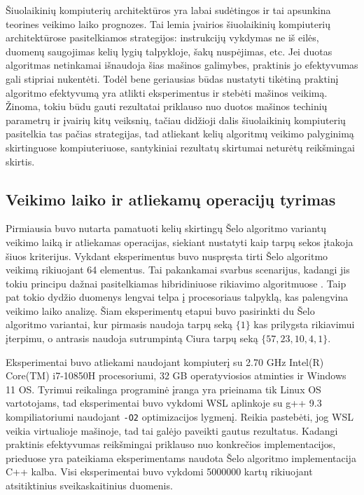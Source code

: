 \documentclass{VUMIFInfBakalaurinis}
\begin{document}
Šiuolaikinių kompiuterių architektūros yra labai sudėtingos ir tai apsunkina teorines veikimo laiko prognozes.
Tai lemia įvairios šiuolaikinių kompiuterių architektūrose pasitelkiamos strategijos:
instrukcijų vykdymas ne iš eilės, duomenų saugojimas kelių lygių talpykloje, šakų nuspėjimas, etc.
Jei duotas algoritmas netinkamai išnaudoja šias mašinos galimybes, praktinis jo efektyvumas gali stipriai nukentėti.
Todėl bene geriausias būdas nustatyti tikėtiną praktinį algoritmo efektyvumą yra atlikti eksperimentus ir stebėti mašinos veikimą.
Žinoma, tokiu būdu gauti rezultatai priklauso nuo duotos mašinos techinių parametrų ir įvairių kitų veiksnių, tačiau didžioji dalis
šiuolaikinių kompiuterių pasitelkia tas pačias strategijas, tad atliekant kelių algoritmų veikimo palyginimą skirtinguose kompiuteriuose,
santykiniai rezultatų skirtumai neturėtų reikšmingai skirtis.  

\subsection{Veikimo laiko ir atliekamų operacijų tyrimas}

Pirmiausia buvo nutarta pamatuoti kelių skirtingų Šelo algoritmo variantų veikimo laiką ir atliekamas operacijas, siekiant nustatyti kaip tarpų sekos įtakoja šiuos kriterijus.
Vykdant eksperimentus buvo nuspręsta tirti Šelo algoritmo veikimą rikiuojant 64 elementus.
Tai pakankamai svarbus scenarijus, kadangi jis tokiu principu dažnai pasitelkiamas hibridiniuose rikiavimo algoritmuose \cite{golangsort,bzip2sort}.
Taip pat tokio dydžio duomenys lengvai telpa į procesoriaus talpyklą, kas palengvina veikimo laiko analizę.
Šiam eksperimentų etapui buvo pasirinkti du Šelo algoritmo variantai, kur pirmasis naudoja tarpų seką $\{1\}$ kas prilygsta rikiavimui įterpimu, o antrasis naudoja sutrumpintą Ciura tarpų seką $\{57,23,10,4,1\}$.

Eksperimentai buvo atliekami naudojant kompiuterį su 2.70 GHz Intel(R) Core(TM) i7-10850H procesoriumi, 32 GB operatyviosios atminties ir Windows 11 OS.
Tyrimui reikalinga programinė įranga yra prieinama tik Linux OS vartotojams, tad eksperimentai buvo vykdomi WSL aplinkoje su g++ 9.3 kompiliatoriumi naudojant \verb|-O2| optimizacijos lygmenį.
Reikia pastebėti, jog WSL veikia virtualioje mašinoje, tad tai galėjo paveikti gautus rezultatus.
Kadangi praktinis efektyvumas reikšmingai priklauso nuo konkrečios implementacijos, prieduose yra pateikiama eksperimentams naudota Šelo algoritmo implementacija C++ kalba.
Visi eksperimentai buvo vykdomi 5000000 kartų rikiuojant atsitiktinius sveikaskaitinius duomenis.
\end{document}

